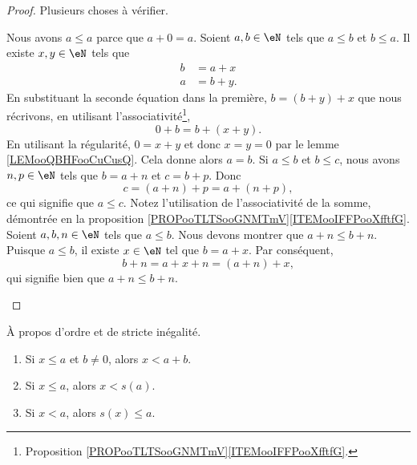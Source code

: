 \begin{proof}
	Plusieurs choses à vérifier.
	\begin{subproof}
		\spitem[Réflexive]
		Nous avons \( a\leq a\) parce que \( a+0=a\).
		\spitem[Antisymétrique]
		Soient \( a,b\in \eN\) tels que \( a\leq b\) et \( b\leq a\). Il existe \( x,y\in \eN\) tels que
		\begin{subequations}
			\begin{align}
				b & =a+x  \\
				a & =b+y.
			\end{align}
		\end{subequations}
		En substituant la seconde équation dans la première, \( b=(b+y)+x\) que nous récrivons, en utilisant l'associativité\footnote{Proposition \ref{PROPooTLTSooGNMTmV}\ref{ITEMooIFFPooXfftfG}.},
		\begin{equation}
			0+b=b+(x+y).
		\end{equation}
		En utilisant la régularité, \( 0=x+y\) et donc \( x=y=0\) par le lemme \ref{LEMooQBHFooCuCusQ}. Cela donne alors \( a=b\).
		\spitem[Transitive]
		Si \( a\leq b\) et \( b\leq c\), nous avons \( n,p\in \eN\) tels que \( b=a+n\) et \( c=b+p\). Donc
		\begin{equation}
			c=(a+n)+p=a+(n+p),
		\end{equation}
		ce qui signifie que \( a\leq c\). Notez l'utilisation de l'associativité de la somme, démontrée en la proposition \ref{PROPooTLTSooGNMTmV}\ref{ITEMooIFFPooXfftfG}.
		\spitem[Compatibilité]
		Soient \( a,b,n\in \eN\) tels que \( a\leq b\). Nous devons montrer que \( a+n\leq b+n\). Puisque \( a\leq b\), il existe \( x\in \eN\) tel que \( b=a+x\). Par conséquent,
		\begin{equation}
			b+n=a+x+n=(a+n)+x,
		\end{equation}
		qui signifie bien que \( a+n\leq b+n\).
	\end{subproof}
\end{proof}

\begin{lemma}       \label{LEMooPVRQooXPMKTt}
	À propos d'ordre et de stricte inégalité.
	\begin{enumerate}
		\item       \label{ITEMooGWWFooYGPCZw}
		      Si \( x\leq a\) et \( b\neq 0\), alors \( x<a+b\).
		\item       \label{ITEMooRWGWooAfkrri}
		      Si \( x\leq a\), alors \( x<s(a)\).
		\item       \label{ITEMooWCOIooMWrCag}
		      Si \( x<a\), alors \( s(x)\leq a\).
	\end{enumerate}
\end{lemma}

